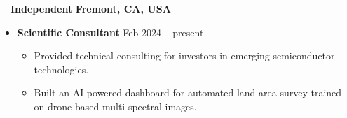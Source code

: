 ~~{\color{black}\textbf{Independent} \hfill  \textbf{Fremont, CA, USA}}\par
\begin{itemize}
    \item
        \textbf{Scientific Consultant}
        \hfill  {Feb 2024 -- present} \par
        \begin{itemize}
            \item Provided technical consulting for investors in emerging semiconductor technologies. 
            \item Built an AI-powered dashboard for automated land area survey trained on drone-based multi-spectral images. 
        \end{itemize}
\end{itemize}